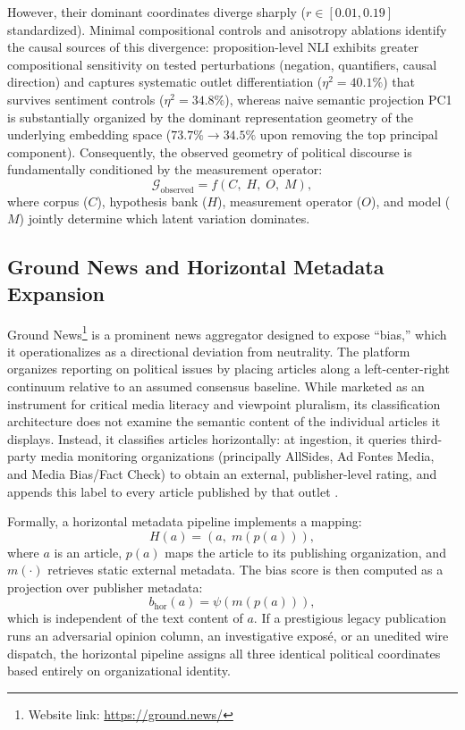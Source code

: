However, their dominant coordinates diverge sharply ($r \in [0.01, 0.19]$ standardized). Minimal compositional controls and anisotropy ablations identify the causal sources of this divergence: proposition-level NLI exhibits greater compositional sensitivity on tested perturbations (negation, quantifiers, causal direction) and captures systematic outlet differentiation ($\eta^2 = 40.1\%$) that survives sentiment controls ($\eta^2 = 34.8\%$), whereas naive semantic projection PC1 is substantially organized by the dominant representation geometry of the underlying embedding space ($73.7\% \to 34.5\%$ upon removing the top principal component). Consequently, the observed geometry of political discourse is fundamentally conditioned by the measurement operator:
\begin{equation}
    \mathcal{G}_{\text{observed}} = f(C,\; H,\; O,\; M),
\end{equation}
where corpus ($C$), hypothesis bank ($H$), measurement operator ($O$), and model ($M$) jointly determine which latent variation dominates.

\subsection{Ground News and Horizontal Metadata Expansion}

Ground News\footnote{Website link: \url{https://ground.news/}} is a prominent news aggregator designed to expose ``bias,'' which it operationalizes as a directional deviation from neutrality. The platform organizes reporting on political issues by placing articles along a left-center-right continuum relative to an assumed consensus baseline. While marketed as an instrument for critical media literacy and viewpoint pluralism, its classification architecture does not examine the semantic content of the individual articles it displays. Instead, it classifies articles horizontally: at ingestion, it queries third-party media monitoring organizations (principally AllSides, Ad Fontes Media, and Media Bias/Fact Check) to obtain an external, publisher-level rating, and appends this label to every article published by that outlet \citep{allsidesmethod,groundnewsrating}.

Formally, a horizontal metadata pipeline implements a mapping:
\begin{equation}
    H(a) = (a,\; m(p(a))),
\end{equation}
where $a$ is an article, $p(a)$ maps the article to its publishing organization, and $m(\cdot)$ retrieves static external metadata. The bias score is then computed as a projection over publisher metadata:
\begin{equation}
    b_{\text{hor}}(a) = \psi(m(p(a))),
\end{equation}
which is independent of the text content of $a$. If a prestigious legacy publication runs an adversarial opinion column, an investigative exposé, or an unedited wire dispatch, the horizontal pipeline assigns all three identical political coordinates based entirely on organizational identity.

